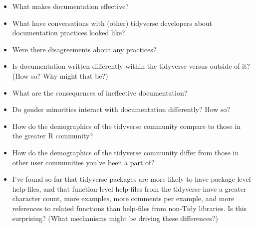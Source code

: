 \begin{itemize}
    \item What makes documentation effective?
    \item What have conversations with (other) tidyverse developers about documentation practices looked like? 
    \item Were there disagreements about any practices?
    \item Is documentation written differently within the tidyverse versus outside of it? (How so? Why might that be?)
    \item What are the consequences of ineffective documentation?
    \item Do gender minorities interact with documentation differently? How so?
    \item How do the demographics of the tidyverse community compare to those in the greater R community?
    \item How do the demographics of the tidyverse community differ from those in other user communities you've been a part of?
    \item I’ve found so far that tidyverse packages are more likely to have package-level help-files, and that function-level help-files from the tidyverse have a greater character count, more examples, more comments per example, and more references to related functions than help-files from non-Tidy libraries. Is this surprising? (What mechanisms might be driving these differences?)
\end{itemize}
